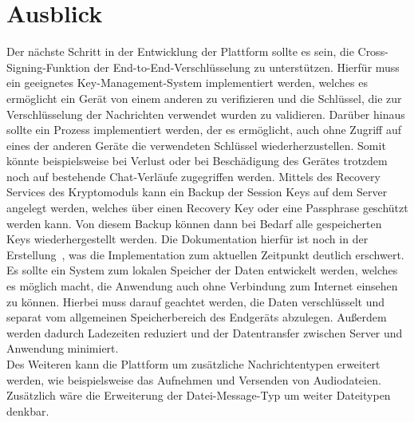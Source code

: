     \chapter{Ausblick}\label{ch:ausblick}
    Der nächste Schritt in der Entwicklung der Plattform sollte es sein, die Cross-Signing-Funktion der End-to-End-Verschlüsselung zu unterstützen.
    Hierfür muss ein geeignetes Key-Management-System implementiert werden, welches es ermöglicht ein Gerät von einem anderen zu verifizieren und die Schlüssel, die zur Verschlüsselung der Nachrichten verwendet wurden zu validieren.
    Darüber hinaus sollte ein Prozess implementiert werden, der es ermöglicht, auch ohne Zugriff auf eines der anderen Geräte die verwendeten Schlüssel wiederherzustellen.
    Somit könnte beispielsweise bei Verlust oder bei Beschädigung des Gerätes trotzdem noch auf bestehende Chat-Verläufe zugegriffen werden.
    Mittels des Recovery Services des Kryptomoduls kann ein Backup der Session Keys auf dem Server angelegt werden, welches über einen Recovery Key oder eine Passphrase geschützt werden kann.
    Von diesem Backup können dann bei Bedarf alle gespeicherten Keys wiederhergestellt werden.
    Die Dokumentation hierfür ist noch in der Erstellung~\cite{advancede2e}, was die Implementation zum aktuellen Zeitpunkt deutlich erschwert.\\
    Es sollte ein System zum lokalen Speicher der Daten entwickelt werden, welches es möglich macht, die Anwendung auch ohne Verbindung zum Internet einsehen zu können.
    Hierbei muss darauf geachtet werden, die Daten verschlüsselt und separat vom allgemeinen Speicherbereich des Endgeräts abzulegen.
    Außerdem werden dadurch Ladezeiten reduziert und der Datentransfer zwischen Server und Anwendung minimiert.\\
    Des Weiteren kann die Plattform um zusätzliche Nachrichtentypen erweitert werden, wie beispielsweise das Aufnehmen und Versenden von Audiodateien.
    Zusätzlich wäre die Erweiterung der Datei-Message-Typ um weiter Dateitypen denkbar.

%

